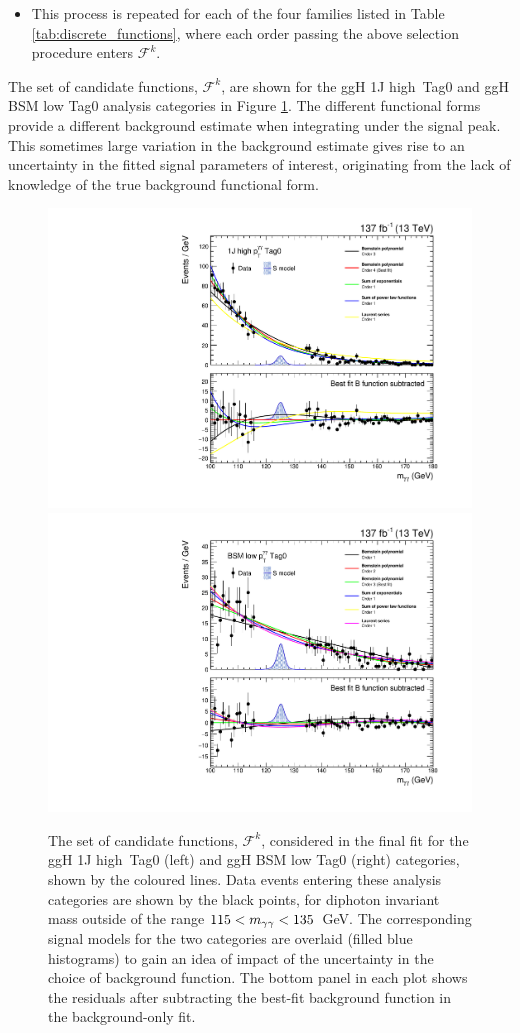 \begin{itemize}
    \item This process is repeated for each of the four families listed in Table \ref{tab:discrete_functions}, where each order passing the above selection procedure enters $\mathcal{F}^k$.
\end{itemize}

The set of candidate functions, $\mathcal{F}^k$, are shown for the ggH 1J high~\ptgg Tag0 and ggH BSM low \ptgg Tag0 analysis categories in Figure \ref{fig:bkgmodels_category}. The different functional forms provide a different background estimate when integrating under the signal peak. This sometimes large variation in the background estimate gives rise to an uncertainty in the fitted signal parameters of interest, originating from the lack of knowledge of the true background functional form.

\begin{figure}[hptb]
  \centering
  \includegraphics[width=.49\textwidth]{Figures/hgg_stats/bmodel_RECO_1J_PTH_120_200_Tag0.pdf}
  \hfill
  \includegraphics[width=.49\textwidth]{Figures/hgg_stats/bmodel_RECO_PTH_200_300_Tag0.pdf}
  \caption[Background models for the 1J high \ptgg Tag0 and qqH VH-like Tag0 categories]
  {
    The set of candidate functions, $\mathcal{F}^k$, considered in the final fit for the ggH 1J high~\ptgg Tag0 (left) and ggH BSM low \ptgg Tag0 (right) categories, shown by the coloured lines. Data events entering these analysis categories are shown by the black points, for diphoton invariant mass outside of the range $115<m_{\gamma\gamma}<135$~GeV. The corresponding signal models for the two categories are overlaid (filled blue histograms) to gain an idea of impact of the uncertainty in the choice of background function. The bottom panel in each plot shows the residuals after subtracting the best-fit background function in the background-only fit.
  }
  \label{fig:bkgmodels_category}
\end{figure}

